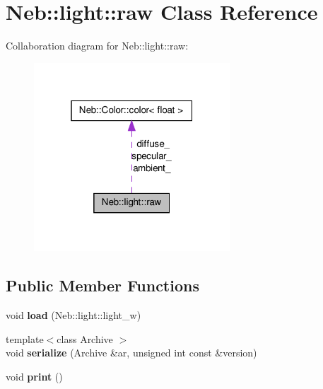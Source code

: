 \hypertarget{classNeb_1_1light_1_1raw}{\section{\-Neb\-:\-:light\-:\-:raw \-Class \-Reference}
\label{classNeb_1_1light_1_1raw}
}


\-Collaboration diagram for \-Neb\-:\-:light\-:\-:raw\-:\nopagebreak
\begin{figure}[H]
\begin{center}
\leavevmode
\includegraphics[width=208pt]{classNeb_1_1light_1_1raw__coll__graph}
\end{center}
\end{figure}
\subsection*{\-Public \-Member \-Functions}
\begin{DoxyCompactItemize}
\item 
\hypertarget{classNeb_1_1light_1_1raw_a438d482d875d0f8e6a4774522ddc38d7}{void {\bfseries load} (\-Neb\-::light\-::light\-\_\-w)}\label{classNeb_1_1light_1_1raw_a438d482d875d0f8e6a4774522ddc38d7}

\item 
\hypertarget{classNeb_1_1light_1_1raw_aa5d3234e06367c7bc8e137574b3fce5e}{{\footnotesize template$<$class Archive $>$ }\\void {\bfseries serialize} (\-Archive \&ar, unsigned int const \&version)}\label{classNeb_1_1light_1_1raw_aa5d3234e06367c7bc8e137574b3fce5e}

\item 
\hypertarget{classNeb_1_1light_1_1raw_a2be26c3e283d235caedd447cb689f5de}{void {\bfseries print} ()}\label{classNeb_1_1light_1_1raw_a2be26c3e283d235caedd447cb689f5de}

\end{DoxyCompactItemize}
